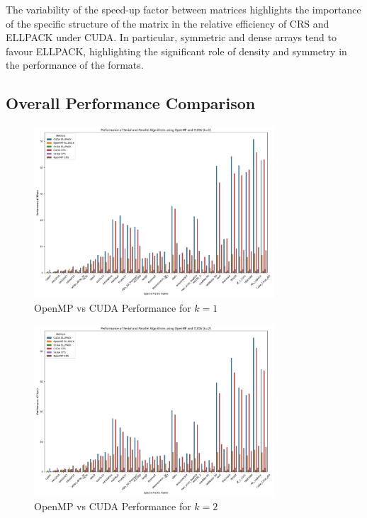 \documentclass[12pt,oneside]{book} %
\begin{document}
The variability of the speed-up factor between matrices highlights the
importance of the specific structure of the matrix in the relative efficiency
of CRS and ELLPACK under CUDA. In particular, symmetric and dense arrays tend
to favour ELLPACK, highlighting the significant role of density and symmetry in
the performance of the formats.

\subsection{Overall Performance Comparison}
\begin{figure}[H]
    \centering
    \includegraphics[width=0.8\textwidth]{../results/images/OpenMP_vs_CUDA_Performance_k1.png}
    \caption{OpenMP vs CUDA Performance for $k=1$}
    \label{fig:openmp-cuda-performance-k1}
\end{figure}

\begin{figure}[H]
    \centering
    \includegraphics[width=0.8\textwidth]{../results/images/OpenMP_vs_CUDA_Performance_k2.png}
    \caption{OpenMP vs CUDA Performance for $k=2$}
    \label{fig:openmp-cuda-performance-k2}
\end{figure}
\end{document}
